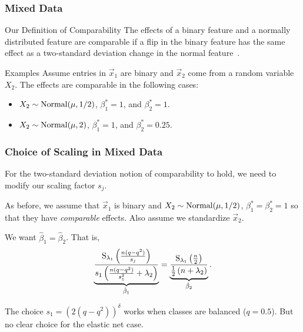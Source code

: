 \documentclass[aspectratio=1610,onlytextwidth]{beamer}
\begin{document}
\begin{frame}[c]
  \frametitle{Mixed Data}

  \begin{block}{Our Definition of Comparability}
    The effects of a binary feature and a normally distributed feature are \alert{comparable} if a flip in the binary feature has the same effect as a two-standard deviation change in the normal feature~\parencite{gelman2008}.
  \end{block}

  \pause

  \begin{exampleblock}{Examples}
    Assume entries in \(\vec{x}_1\) are binary and \(\vec{x}_2\) come from a random variable \(X_2\). The effects are comparable in the following cases:
    \begin{itemize}
      \item \(X_2 \sim \operatorname{Normal}(\mu, 1/2)\), \(\beta_1^* = 1\), and \(\beta_2^* = 1\).
      \item \(X_2 \sim \operatorname{Normal}(\mu, 2)\), \(\beta_1^* = 1\), and \(\beta_2^* = 0.25\).
    \end{itemize}
  \end{exampleblock}
\end{frame}

\begin{frame}[c]
  \frametitle{Choice of Scaling in Mixed Data}

  For the two-standard deviation notion of comparability to hold, we need to modify our
  scaling factor \(s_j\).

  \bigskip\pause

  As before, we assume that \(\vec{x}_1\) is binary and \(X_2 \sim \operatorname{Normal}(\mu, 1/2)\),
  \(\beta_1^* = \beta_2^* = 1\) so that they have \emph{comparable} effects. Also assume we
  standardize \(\vec{x}_2\).

  \medskip

  We want \(\hat{\beta}_1 = \hat{\beta}_2\). That is,
  \[
    \underbrace{\frac{\operatorname{S}_{\lambda_1}\left(\frac{n (q - q^2)}{s_j}\right)}{s_1\left(\frac{n(q - q^2)}{s_1^2} + \lambda_2\right)}}_{\hat{\beta}_1}  = \underbrace{\frac{\operatorname{S}_{\lambda_1}\left(\frac{n}{2}\right)}{\frac{1}{2}\left(n + \lambda_2\right)}}_{\hat{\beta}_2}.
  \]

  \medskip\pause

  The choice \(s_1 = (2 (q - q^2))^\delta\) works when classes are balanced (\(q = 0.5\)).
  But no clear choice for the elastic net case.
\end{frame}
\end{document}
